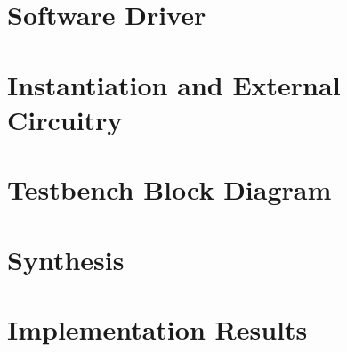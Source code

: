 \documentclass{\TEX/ug/ug}
\begin{document}
\ifdefined\SW
\section{Software Driver}
\label{sec:sw}

\fi

\section{Instantiation and External Circuitry}
\label{sec:inst}


\section{Testbench Block Diagram}
\label{sec:tbbd}


\section{Synthesis}
\label{sec:synth}


\section{Implementation Results}
\label{sec:results}


\ifdefined\CUSTOM

\fi
\end{document}
